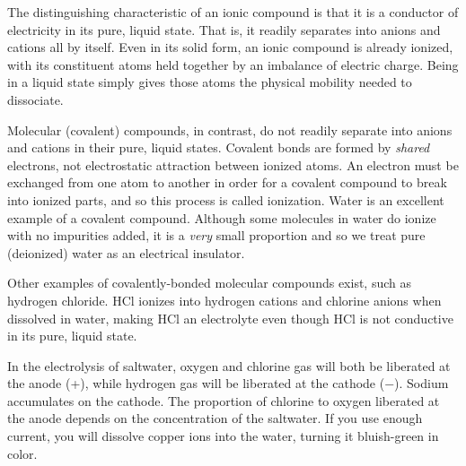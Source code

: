 \vskip 10pt

The distinguishing characteristic of an ionic compound is that it is a conductor of electricity in its pure, liquid state.  That is, it readily separates into anions and cations all by itself.  Even in its solid form, an ionic compound is already ionized, with its constituent atoms held together by an imbalance of electric charge.  Being in a liquid state simply gives those atoms the physical mobility needed to dissociate.

\vskip 10pt

Molecular (covalent) compounds, in contrast, do not readily separate into anions and cations in their pure, liquid states.  Covalent bonds are formed by {\it shared} electrons, not electrostatic attraction between ionized atoms.  An electron must be exchanged from one atom to another in order for a covalent compound to break into ionized parts, and so this process is called ionization.  Water is an excellent example of a covalent compound.  Although some molecules in water do ionize with no impurities added, it is a {\it very} small proportion and so we treat pure (deionized) water as an electrical insulator.

Other examples of covalently-bonded molecular compounds exist, such as hydrogen chloride.  HCl ionizes into hydrogen cations and chlorine anions when dissolved in water, making HCl an electrolyte even though HCl is not conductive in its pure, liquid state.

\vskip 10pt

In the electrolysis of saltwater, oxygen and chlorine gas will both be liberated at the anode (+), while hydrogen gas will be liberated at the cathode ($-$).  Sodium accumulates on the cathode.  The proportion of chlorine to oxygen liberated at the anode depends on the concentration of the saltwater.  If you use enough current, you will dissolve copper ions into the water, turning it bluish-green in color.











